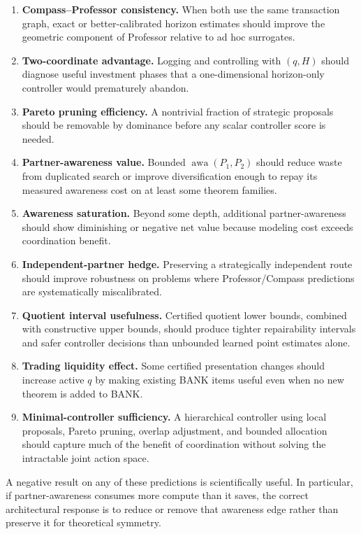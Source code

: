 \documentclass[11pt]{article}
\theoremstyle{definition}
\theoremstyle{remark}
\newcommand{\awa}{\operatorname{awa}}
\begin{document}
\begin{enumerate}
\item \textbf{Compass--Professor consistency.} When both use the same transaction graph, exact or better-calibrated horizon estimates should improve the geometric component of Professor relative to ad hoc surrogates.
\item \textbf{Two-coordinate advantage.} Logging and controlling with $(q,H)$ should diagnose useful investment phases that a one-dimensional horizon-only controller would prematurely abandon.
\item \textbf{Pareto pruning efficiency.} A nontrivial fraction of strategic proposals should be removable by dominance before any scalar controller score is needed.
\item \textbf{Partner-awareness value.} Bounded $\awa(P_1,P_2)$ should reduce waste from duplicated search or improve diversification enough to repay its measured awareness cost on at least some theorem families.
\item \textbf{Awareness saturation.} Beyond some depth, additional partner-awareness should show diminishing or negative net value because modeling cost exceeds coordination benefit.
\item \textbf{Independent-partner hedge.} Preserving a strategically independent route should improve robustness on problems where Professor/Compass predictions are systematically miscalibrated.
\item \textbf{Quotient interval usefulness.} Certified quotient lower bounds, combined with constructive upper bounds, should produce tighter repairability intervals and safer controller decisions than unbounded learned point estimates alone.
\item \textbf{Trading liquidity effect.} Some certified presentation changes should increase active $q$ by making existing BANK items useful even when no new theorem is added to BANK.
\item \textbf{Minimal-controller sufficiency.} A hierarchical controller using local proposals, Pareto pruning, overlap adjustment, and bounded allocation should capture much of the benefit of coordination without solving the intractable joint action space.
\end{enumerate}

A negative result on any of these predictions is scientifically useful. In particular, if partner-awareness consumes more compute than it saves, the correct architectural response is to reduce or remove that awareness edge rather than preserve it for theoretical symmetry.
\end{document}
